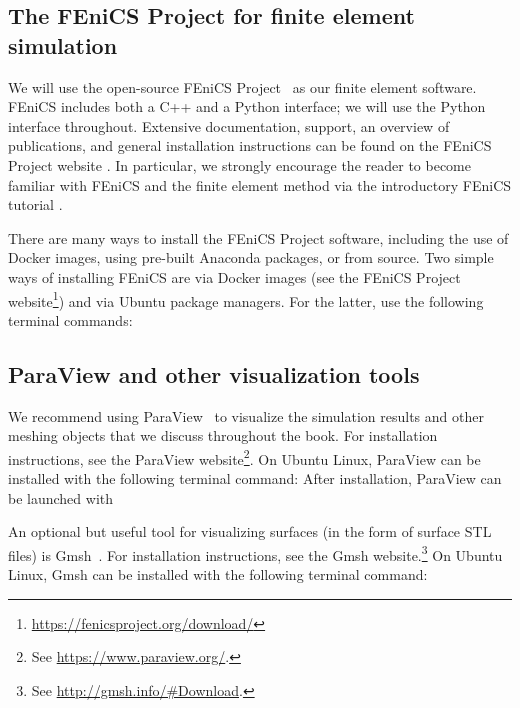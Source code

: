 \subsection{The FEniCS Project for finite element simulation}
\label{sec:chp2:tools:fenics}

We will use the open-source FEniCS Project~\cite{alnaes2015fenics,
  logg2012automated} as our finite element software. FEniCS includes
both a C++ and a Python interface; we will use the Python interface
throughout. Extensive documentation, support, an overview of
publications, and general installation instructions can be found on
the FEniCS Project website \cite{fenicsproject}. In particular, we
strongly encourage the reader to become familiar with FEniCS and the
finite element method via the introductory FEniCS tutorial
\cite{langtangen2016solving}.

There are many ways to install the FEniCS Project software, including
the use of Docker images, using pre-built Anaconda packages, or from
source. Two simple ways of installing FEniCS are via Docker
images (see the FEniCS Project
website\footnote{\url{https://fenicsproject.org/download/}}) and via Ubuntu
package managers. For the latter, use the following terminal commands:


\subsection{ParaView and other visualization tools}
\label{sec:chp2:paraview}

 We recommend using ParaView~\cite{ahrens2005paraview}
to visualize the simulation results and other meshing objects that we
discuss throughout the book. For installation instructions, see the
ParaView website\footnote{See \url{https://www.paraview.org/}.}. On
Ubuntu Linux, ParaView can be installed with the following terminal
command: 
\noindent After installation, ParaView can be launched with

An optional but useful tool for visualizing surfaces (in the form
of surface STL files) is Gmsh~\cite{geuzaine2009gmsh}. For installation
instructions, see the Gmsh
website.\footnote{See \url{http://gmsh.info/\#Download}.} On Ubuntu Linux,
Gmsh can be installed with the following terminal command:

